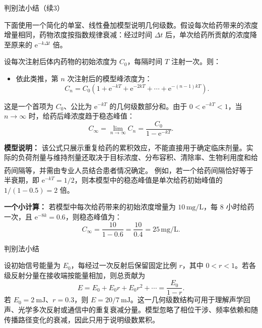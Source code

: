 \documentclass[aspectratio=169,10pt,fontset=fandol]{ctexbeamer}
\newcommand{\ee}{\mathrm{e}}
\newcommand{\upcite}[1]{\textsuperscript{\textsuperscript{\cite{#1}}}}
\begin{document}
\begin{frame}[t,fragile]{判别法小结（续3）}
\footnotesize
{\footnotesize
\begin{application}

下面使用一个简化的单室、线性叠加模型说明几何级数。假设每次给药带来的浓度增量相同，药物浓度按指数规律衰减：经过时间 \(\Delta t\) 后，单次给药所贡献的浓度降至原来的 \(\ee^{-k\Delta t}\) 倍。

设每次注射后体内药物的初始浓度为 \(C_0\)，每隔时间 \(T\) 注射一次。则：
\begin{itemize}

\item 依此类推，第 \(n\) 次注射后的模型峰浓度为：
\[
C_n=C_0\left(1+\ee^{-kT}+\ee^{-2kT}+\cdots+\ee^{-(n-1)kT}\right).
\]
\end{itemize}

这是一个首项为 \(C_0\)、公比为 \(\ee^{-kT}\) 的几何级数部分和。由于 \(0<\ee^{-kT}<1\)，当 \(n\to\infty\) 时，给药后峰浓度趋于稳态峰值：
\[
C_{\infty}=\lim_{n\to\infty}C_n=\frac{C_0}{1-\ee^{-kT}}.
\]

\textbf{模型说明：} 该公式只展示重复给药的累积效应，不能直接用于确定临床剂量。实际的负荷剂量与维持剂量还取决于目标浓度、分布容积、清除率、生物利用度和给药间隔等，并需由专业人员结合患者情况确定。\upcite{NCBISteadyState} 例如，若一个给药间隔恰好等于半衰期，即 \(\ee^{-kT}=1/2\)，则本模型中的稳态峰值是单次给药初始峰值的 \(1/(1-0.5)=2\) 倍。

\textbf{一个小计算：} 若模型中每次给药带来的初始浓度增量为 \(10\,\text{mg/L}\)，每 8 小时给药一次，且 \(\ee^{-8k}=0.6\)，则稳态峰值为：
\[
C_{\infty} = \frac{10}{1 - 0.6} = \frac{10}{0.4} = 25\,\text{mg/L}.
\]
\end{application}
}
\end{frame}
\begin{frame}[t,fragile]{判别法小结}
\footnotesize
{\footnotesize
\begin{application}[工程：多次反射与信号衰减]
设初始信号能量为 $E_0$，每经过一次反射后保留固定比例 $r$，其中 $0<r<1$。若各级反射分量在接收端按能量相加，则总贡献为
\[
E=E_0+E_0r+E_0r^2+\cdots
=\frac{E_0}{1-r}.
\]
若 $E_0=2\ \mathrm{mJ}$、$r=0.3$，则 $E=20/7\ \mathrm{mJ}$。这一几何级数结构可用于理解声学回声、光学多次反射或通信中的重复衰减分量。模型忽略了相位干涉、频率依赖和随传播路径变化的衰减，因此只用于说明级数累积。
\end{application}
}
\end{frame}
\end{document}
